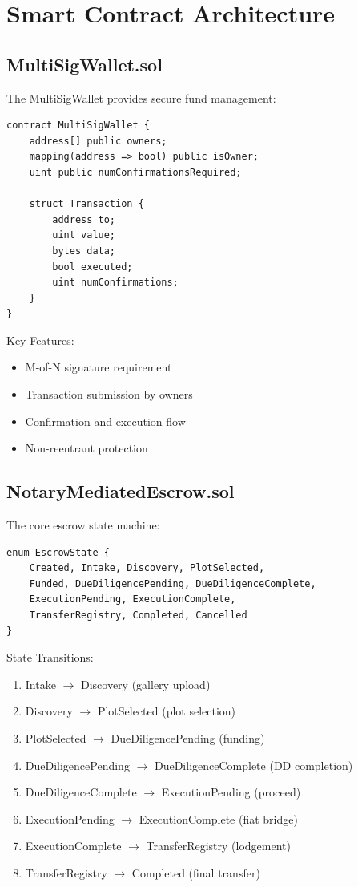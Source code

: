 \documentclass[12pt,a4paper]{article}
\begin{document}
\section{Smart Contract Architecture}

\subsection{MultiSigWallet.sol}
The MultiSigWallet provides secure fund management:

\begin{lstlisting}[language=Solidity]
contract MultiSigWallet {
    address[] public owners;
    mapping(address => bool) public isOwner;
    uint public numConfirmationsRequired;
    
    struct Transaction {
        address to;
        uint value;
        bytes data;
        bool executed;
        uint numConfirmations;
    }
}
\end{lstlisting}

Key Features:
\begin{itemize}
\item M-of-N signature requirement
\item Transaction submission by owners
\item Confirmation and execution flow
\item Non-reentrant protection
\end{itemize}

\subsection{NotaryMediatedEscrow.sol}
The core escrow state machine:

\begin{lstlisting}[language=Solidity]
enum EscrowState { 
    Created, Intake, Discovery, PlotSelected,
    Funded, DueDiligencePending, DueDiligenceComplete,
    ExecutionPending, ExecutionComplete, 
    TransferRegistry, Completed, Cancelled 
}
\end{lstlisting}

State Transitions:
\begin{enumerate}
\item Intake $\rightarrow$ Discovery (gallery upload)
\item Discovery $\rightarrow$ PlotSelected (plot selection)
\item PlotSelected $\rightarrow$ DueDiligencePending (funding)
\item DueDiligencePending $\rightarrow$ DueDiligenceComplete (DD completion)
\item DueDiligenceComplete $\rightarrow$ ExecutionPending (proceed)
\item ExecutionPending $\rightarrow$ ExecutionComplete (fiat bridge)
\item ExecutionComplete $\rightarrow$ TransferRegistry (lodgement)
\item TransferRegistry $\rightarrow$ Completed (final transfer)
\end{enumerate}
\end{document}
